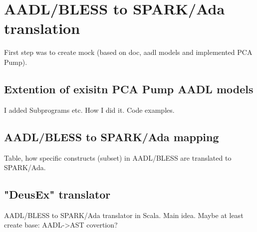 
\cleardoublepage


\chapter{AADL/BLESS to SPARK/Ada translation}
\label{codegen}

First step was to create mock (based on doc, aadl models and implemented PCA Pump).

\section{Extention of exisitn PCA Pump AADL models}
\label{codegen:translator}
I added Subprograms etc.
How I did it. Code examples.

\section{AADL/BLESS to SPARK/Ada mapping}
\label{codegen:mapping}
Table, how specific constructs (subset) in AADL/BLESS are translated to SPARK/Ada.

\section{"DeusEx" translator}
\label{codegen:translator}
AADL/BLESS to SPARK/Ada translator in Scala. Main idea.
Maybe at least create base: AADL->AST covertion?

